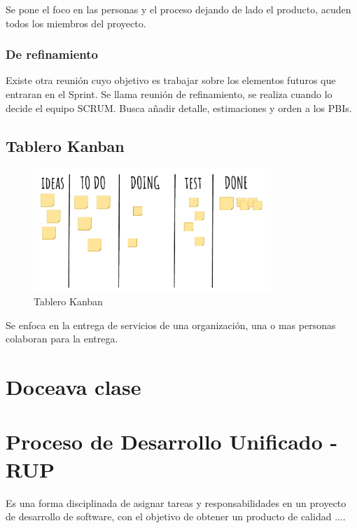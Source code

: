 \documentclass[titlepage,a4paper]{article}
\begin{document}
Se pone el foco en las personas y el proceso dejando de lado el producto, acuden todos los miembros del proyecto.
 
\subsubsection*{De refinamiento}
Existe otra reunión cuyo objetivo es trabajar sobre los elementos futuros que entraran en el Sprint. Se llama reunión de refinamiento, se realiza cuando lo decide el equipo SCRUM. Busca añadir detalle, estimaciones y orden a los PBIs.



\subsection{Tablero Kanban}

\begin{figure}[!htb]
    \centering
    \includegraphics[width=0.8\textwidth]{Imagenes/Kanbanboard.png}
    \caption{Tablero Kanban}
\end{figure}

Se enfoca en la entrega de servicios de una organización, una o mas personas colaboran para la entrega.

\section*{Doceava clase}
\section{Proceso de Desarrollo Unificado - RUP}

Es una forma disciplinada de asignar tareas y responsabilidades en un proyecto de desarrollo de software, con el objetivo de obtener un producto de calidad .... %
\end{document}
